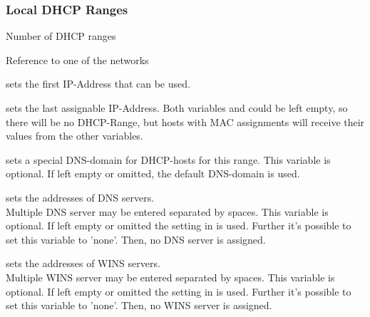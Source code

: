 \subsubsection{Local DHCP Ranges}
\begin{description}

    {Number of DHCP ranges}


    {Reference to one of the  networks}


    {sets the first IP-Address that can be used.}


    {sets the last assignable IP-Address. Both variables
     and  could be left empty, so
    there will be no DHCP-Range, but hosts with MAC assignments will receive their values from the
    other variables.}


    {sets a special DNS-domain for DHCP-hosts for this range.
    This variable is optional. If left empty or omitted, the default DNS-domain  is used.}


    {sets the addresses of DNS servers. \\
    Multiple DNS server may be entered separated by spaces. 
    This variable is optional. If left empty or omitted
    the setting in  is used. 
    Further it's possible to set this variable to 'none'. Then, no DNS server is assigned.}


    {sets the addresses of WINS servers. \\
    Multiple WINS server may be entered separated by spaces.
    This variable is optional. If left empty or omitted
    the setting in  is used. 
    Further it's possible to set this variable to 'none'. Then, no WINS server is assigned.}


\end{description}
